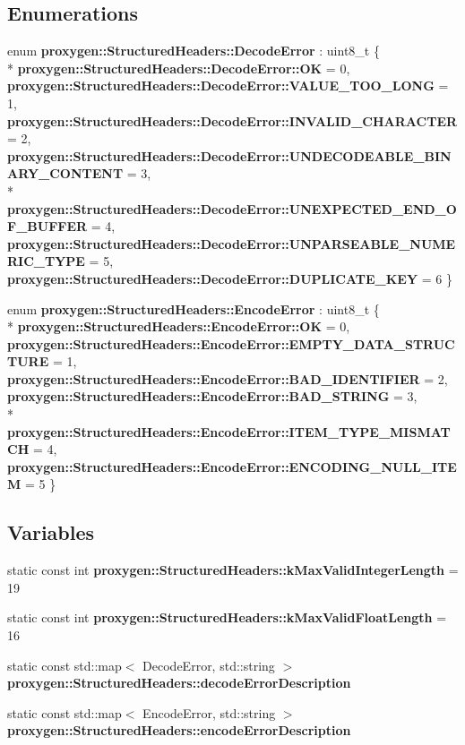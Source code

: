 \subsection*{Enumerations}
\begin{DoxyCompactItemize}
\item 
enum {\bf proxygen\+::\+Structured\+Headers\+::\+Decode\+Error} \+: uint8\+\_\+t \{ \\*
{\bf proxygen\+::\+Structured\+Headers\+::\+Decode\+Error\+::\+OK} = 0, 
{\bf proxygen\+::\+Structured\+Headers\+::\+Decode\+Error\+::\+V\+A\+L\+U\+E\+\_\+\+T\+O\+O\+\_\+\+L\+O\+NG} = 1, 
{\bf proxygen\+::\+Structured\+Headers\+::\+Decode\+Error\+::\+I\+N\+V\+A\+L\+I\+D\+\_\+\+C\+H\+A\+R\+A\+C\+T\+ER} = 2, 
{\bf proxygen\+::\+Structured\+Headers\+::\+Decode\+Error\+::\+U\+N\+D\+E\+C\+O\+D\+E\+A\+B\+L\+E\+\_\+\+B\+I\+N\+A\+R\+Y\+\_\+\+C\+O\+N\+T\+E\+NT} = 3, 
\\*
{\bf proxygen\+::\+Structured\+Headers\+::\+Decode\+Error\+::\+U\+N\+E\+X\+P\+E\+C\+T\+E\+D\+\_\+\+E\+N\+D\+\_\+\+O\+F\+\_\+\+B\+U\+F\+F\+ER} = 4, 
{\bf proxygen\+::\+Structured\+Headers\+::\+Decode\+Error\+::\+U\+N\+P\+A\+R\+S\+E\+A\+B\+L\+E\+\_\+\+N\+U\+M\+E\+R\+I\+C\+\_\+\+T\+Y\+PE} = 5, 
{\bf proxygen\+::\+Structured\+Headers\+::\+Decode\+Error\+::\+D\+U\+P\+L\+I\+C\+A\+T\+E\+\_\+\+K\+EY} = 6
 \}
\item 
enum {\bf proxygen\+::\+Structured\+Headers\+::\+Encode\+Error} \+: uint8\+\_\+t \{ \\*
{\bf proxygen\+::\+Structured\+Headers\+::\+Encode\+Error\+::\+OK} = 0, 
{\bf proxygen\+::\+Structured\+Headers\+::\+Encode\+Error\+::\+E\+M\+P\+T\+Y\+\_\+\+D\+A\+T\+A\+\_\+\+S\+T\+R\+U\+C\+T\+U\+RE} = 1, 
{\bf proxygen\+::\+Structured\+Headers\+::\+Encode\+Error\+::\+B\+A\+D\+\_\+\+I\+D\+E\+N\+T\+I\+F\+I\+ER} = 2, 
{\bf proxygen\+::\+Structured\+Headers\+::\+Encode\+Error\+::\+B\+A\+D\+\_\+\+S\+T\+R\+I\+NG} = 3, 
\\*
{\bf proxygen\+::\+Structured\+Headers\+::\+Encode\+Error\+::\+I\+T\+E\+M\+\_\+\+T\+Y\+P\+E\+\_\+\+M\+I\+S\+M\+A\+T\+CH} = 4, 
{\bf proxygen\+::\+Structured\+Headers\+::\+Encode\+Error\+::\+E\+N\+C\+O\+D\+I\+N\+G\+\_\+\+N\+U\+L\+L\+\_\+\+I\+T\+EM} = 5
 \}
\end{DoxyCompactItemize}
\subsection*{Variables}
\begin{DoxyCompactItemize}
\item 
static const int {\bf proxygen\+::\+Structured\+Headers\+::k\+Max\+Valid\+Integer\+Length} = 19
\item 
static const int {\bf proxygen\+::\+Structured\+Headers\+::k\+Max\+Valid\+Float\+Length} = 16
\item 
static const std\+::map$<$ Decode\+Error, std\+::string $>$ {\bf proxygen\+::\+Structured\+Headers\+::decode\+Error\+Description}
\item 
static const std\+::map$<$ Encode\+Error, std\+::string $>$ {\bf proxygen\+::\+Structured\+Headers\+::encode\+Error\+Description}
\end{DoxyCompactItemize}
